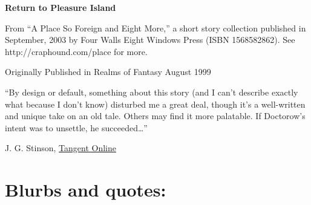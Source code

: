 

\newenvironment{authorof}{\begin{flushright}\sffamily}{\end{flushright}}


\begin{center}
\textbf{\huge\textsf{
Return to Pleasure Island
}}
\end{center}


\noindent

From ``A Place So Foreign and Eight More,'' a short story
collection published in September, 2003 by Four Walls Eight Windows
Press (ISBN 1568582862). See http://craphound.com/place for more.

Originally Published in Realms of Fantasy August 1999

``By design or default, something about this story (and I can't describe 
exactly what because I don't know) disturbed me a great deal, though it's a 
well-written and unique take on an old tale. Others may find it more palatable. 
If Doctorow's intent was to unsettle, he succeeded\ldots{}''

\begin{authorof}
  J. G. Stinson,
  \href{http://www.tangentonline.com/reviews/magazine.php3?review=153}
  {Tangent Online}
\end{authorof}

\section{Blurbs and quotes:}

